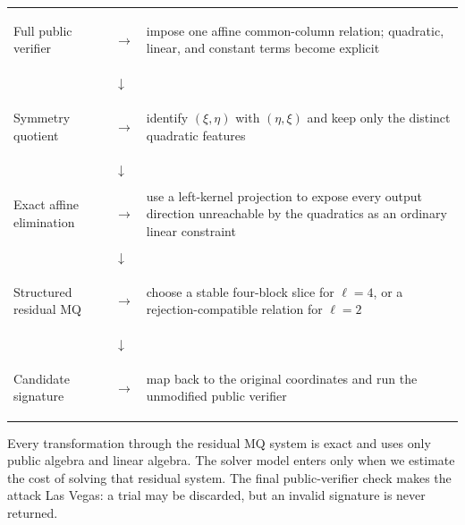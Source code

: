 \documentclass[11pt]{article}
\begin{document}
\begin{center}
\renewcommand{\arraystretch}{1.25}
\begin{tabularx}{0.96\textwidth}{@{}>{\bfseries\raggedright\arraybackslash}p{}>{\centering\arraybackslash}p{}X@{}}
Full public verifier & $\longrightarrow$ & impose one affine common-column
relation; quadratic, linear, and constant terms become explicit\\
& $\downarrow$ & \\
Symmetry quotient & $\longrightarrow$ & identify $(\xi,\eta)$ with
$(\eta,\xi)$ and keep only the distinct quadratic features\\
& $\downarrow$ & \\
Exact affine elimination & $\longrightarrow$ & use a left-kernel projection
to expose every output direction unreachable by the quadratics as an ordinary
linear constraint\\
& $\downarrow$ & \\
Structured residual MQ & $\longrightarrow$ & choose a stable four-block slice
for $\ell=4$, or a rejection-compatible relation for $\ell=2$\\
& $\downarrow$ & \\
Candidate signature & $\longrightarrow$ & map back to the original
coordinates and run the unmodified public verifier
\end{tabularx}
\end{center}

Every transformation through the residual MQ system is exact and uses only
public algebra and linear algebra.  The solver model enters only when we
estimate the cost of solving that residual system.  The final public-verifier
check makes the attack Las Vegas: a trial may be discarded, but an invalid
signature is never returned.
\end{document}
